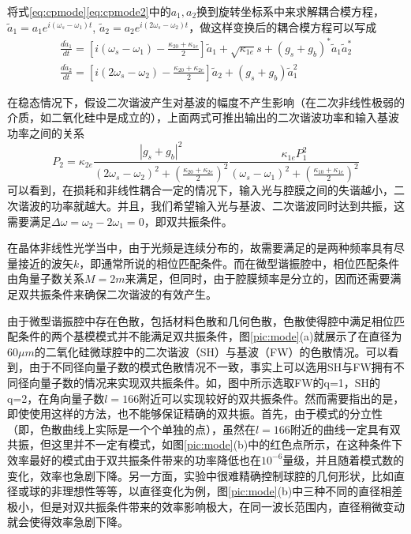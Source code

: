 \documentclass[UTF8,a4paper,cs4size,hyperref]{ctexart}
\begin{document}
将式\ref{eq:cpmode}\ref{eq:cpmode2}中的$a_1, a_2$换到旋转坐标系中来求解耦合模方程，$\tilde{a}_1 = a_1e^{i(\omega_s-\omega_1)t}$, $\tilde{a}_2 = a_2e^{i(2\omega_s-\omega_2)t}$，做这样变换后的耦合模方程可以写成
\begin{gather}
\label{eq:cpmoder}
\frac{d\tilde{a}_1}{dt} = [i(\omega_s-\omega_1)-\frac{\kappa_{20}+\kappa_{1e}}{2}]\tilde{a}_1+\sqrt{\kappa_{1e}}s+(g_s+g_b)^*\tilde{a}_1\tilde{a}_2^* \\
\frac{d\tilde{a}_2}{dt} = [i(2\omega_s-\omega_2)-\frac{\kappa_{20}+\kappa_{2e}}{2}]\tilde{a}_2+(g_s+g_b)\tilde{a}_1^2
\label{eq:cpmoder2}
\end{gather}

在稳态情况下，假设二次谐波产生对基波的幅度不产生影响（在二次非线性极弱的介质，如二氧化硅中是成立的），上面两式可推出输出的二次谐波功率和输入基波功率之间的关系
\begin{equation}
P_2 = \kappa_{2e}\frac{|g_s+g_b|^2}{(2\omega_s-\omega_2)^2+(\frac{\kappa_{20}+\kappa_{2e}}{2})^2}\frac{\kappa_{1e}P_1^2}{(\omega_s-\omega_1)^2+(\frac{\kappa_{10}+\kappa_{1e}}{2})^2}
\end{equation}
可以看到，在损耗和非线性耦合一定的情况下，输入光与腔膜之间的失谐越小，二次谐波的功率就越大。并且，我们希望输入光与基波、二次谐波同时达到共振，这需要满足$\Delta \omega = \omega_2 - 2\omega_1=0$，即双共振条件。

在晶体非线性光学当中，由于光频是连续分布的，故需要满足的是两种频率具有尽量接近的波矢$k$，即通常所说的相位匹配条件。而在微型谐振腔中，相位匹配条件由角量子数关系$M=2m$来满足，但同时，由于腔膜频率是分立的，因而还需要满足双共振条件来确保二次谐波的有效产生。

由于微型谐振腔中存在色散，包括材料色散和几何色散，色散使得腔中满足相位匹配条件的两个基模模式并不能满足双共振条件，图\ref{pic:mode}(a)就展示了在直径为60$\mu m$的二氧化硅微球腔中的二次谐波（SH）与基波（FW）的色散情况。可以看到，由于不同径向量子数的模式色散情况不一致，事实上可以选用SH与FW拥有不同径向量子数的情况来实现双共振条件。如，图中所示选取FW的q=1，SH的q=2，在角向量子数$l=166$附近可以实现较好的双共振条件。然而需要指出的是，即使使用这样的方法，也不能够保证精确的双共振。首先，由于模式的分立性（即，色散曲线上实际是一个个单独的点），虽然在$l=166$附近的曲线一定具有双共振，但这里并不一定有模式，如图\ref{pic:mode}(b)中的红色点所示，在这种条件下效率最好的模式由于双共振条件带来的功率降低也在$10^{-6}$量级，并且随着模式数的变化，效率也急剧下降。另一方面，实验中很难精确控制球腔的几何形状，比如直径或球的非理想性等等，以直径变化为例，图\ref{pic:mode}(b)中三种不同的直径相差极小，但是对双共振条件带来的效率影响极大，在同一波长范围内，直径稍微变动就会使得效率急剧下降。
\end{document}
